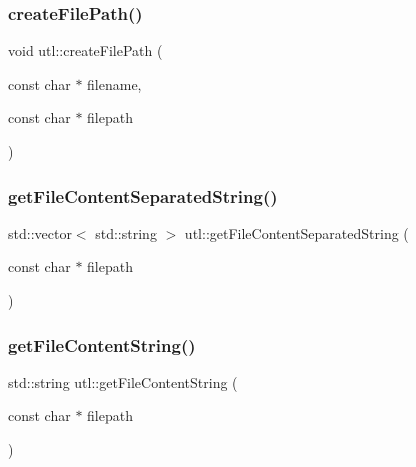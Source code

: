 \mbox{\label{namespaceutl_aec92e28ae2ed3f04cafaddc0d9287e70}} 
\subsubsection{\texorpdfstring{create\+File\+Path()}{createFilePath()}}
{\footnotesize\ttfamily void utl\+::create\+File\+Path (\begin{DoxyParamCaption}\item[{const char $\ast$}]{filename,  }\item[{const char $\ast$}]{filepath }\end{DoxyParamCaption})}

\mbox{\label{namespaceutl_ad5cc7d9f2d66b160d610e1786c898371}} 
\subsubsection{\texorpdfstring{get\+File\+Content\+Separated\+String()}{getFileContentSeparatedString()}}
{\footnotesize\ttfamily std\+::vector$<$ std\+::string $>$ utl\+::get\+File\+Content\+Separated\+String (\begin{DoxyParamCaption}\item[{const char $\ast$}]{filepath }\end{DoxyParamCaption})}

\mbox{\label{namespaceutl_a8ee3ec7274b0811ca49ec96d4cfc8346}} 
\subsubsection{\texorpdfstring{get\+File\+Content\+String()}{getFileContentString()}}
{\footnotesize\ttfamily std\+::string utl\+::get\+File\+Content\+String (\begin{DoxyParamCaption}\item[{const char $\ast$}]{filepath }\end{DoxyParamCaption})}

